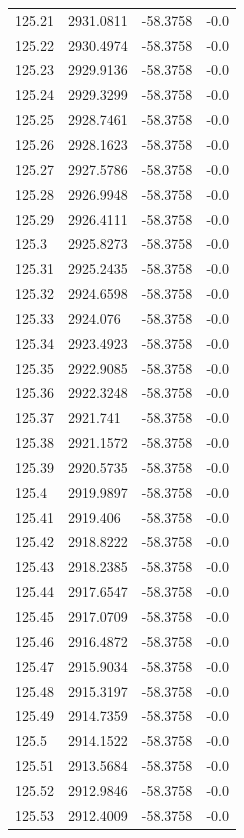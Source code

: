 \begin{table}[H]
\begin{tabular}{llll}
125.21 & 2931.0811 & -58.3758 & -0.0 \\
125.22 & 2930.4974 & -58.3758 & -0.0 \\
125.23 & 2929.9136 & -58.3758 & -0.0 \\
125.24 & 2929.3299 & -58.3758 & -0.0 \\
125.25 & 2928.7461 & -58.3758 & -0.0 \\
125.26 & 2928.1623 & -58.3758 & -0.0 \\
125.27 & 2927.5786 & -58.3758 & -0.0 \\
125.28 & 2926.9948 & -58.3758 & -0.0 \\
125.29 & 2926.4111 & -58.3758 & -0.0 \\
125.3 & 2925.8273 & -58.3758 & -0.0 \\
125.31 & 2925.2435 & -58.3758 & -0.0 \\
125.32 & 2924.6598 & -58.3758 & -0.0 \\
125.33 & 2924.076 & -58.3758 & -0.0 \\
125.34 & 2923.4923 & -58.3758 & -0.0 \\
125.35 & 2922.9085 & -58.3758 & -0.0 \\
125.36 & 2922.3248 & -58.3758 & -0.0 \\
125.37 & 2921.741 & -58.3758 & -0.0 \\
125.38 & 2921.1572 & -58.3758 & -0.0 \\
125.39 & 2920.5735 & -58.3758 & -0.0 \\
125.4 & 2919.9897 & -58.3758 & -0.0 \\
125.41 & 2919.406 & -58.3758 & -0.0 \\
125.42 & 2918.8222 & -58.3758 & -0.0 \\
125.43 & 2918.2385 & -58.3758 & -0.0 \\
125.44 & 2917.6547 & -58.3758 & -0.0 \\
125.45 & 2917.0709 & -58.3758 & -0.0 \\
125.46 & 2916.4872 & -58.3758 & -0.0 \\
125.47 & 2915.9034 & -58.3758 & -0.0 \\
125.48 & 2915.3197 & -58.3758 & -0.0 \\
125.49 & 2914.7359 & -58.3758 & -0.0 \\
125.5 & 2914.1522 & -58.3758 & -0.0 \\
125.51 & 2913.5684 & -58.3758 & -0.0 \\
125.52 & 2912.9846 & -58.3758 & -0.0 \\
125.53 & 2912.4009 & -58.3758 & -0.0 \\

\end{tabular}
\end{table}

